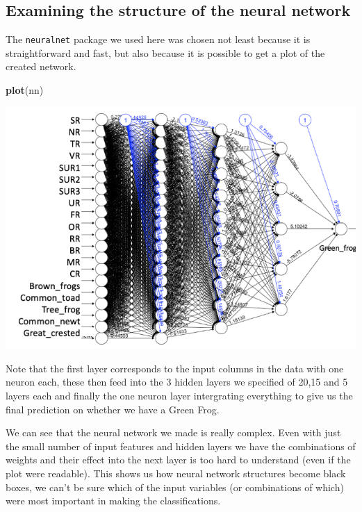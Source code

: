 \documentclass[
]{book}
\newenvironment{Shaded}{\begin{snugshade}}{\end{snugshade}}
\newcommand{\KeywordTok}[1]{\textcolor[rgb]{0.13,0.29,0.53}{\textbf{#1}}}
\newcommand{\NormalTok}[1]{#1}
\begin{document}
\hypertarget{examining-the-structure-of-the-neural-network}{%
\subsection{Examining the structure of the neural network}\label{examining-the-structure-of-the-neural-network}}

The \texttt{neuralnet} package we used here was chosen not least because it is straightforward and fast, but also because it is possible to get a plot of the created network.

\begin{Shaded}
\begin{Highlighting}[]
\KeywordTok{plot}\NormalTok{(nn)}
\end{Highlighting}
\end{Shaded}

\includegraphics{figs/nn_viz.png}

Note that the first layer corresponds to the input columns in the data with one neuron each, these then feed into the 3 hidden layers we specified of 20,15 and 5 layers each and finally the one neuron layer intergrating everything to give us the final prediction on whether we have a Green Frog.

We can see that the neural network we made is really complex. Even with just the small number of input features and hidden layers we have the combinations of weights and their effect into the next layer is too hard to understand (even if the plot were readable). This shows us how neural network structures become black boxes, we can't be sure which of the input variables (or combinations of which) were most important in making the classifications.
\end{document}
